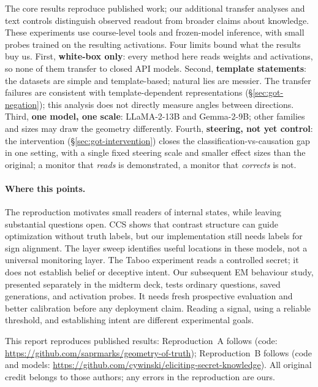 \documentclass{article}
\begin{document}
The core results reproduce published work; our additional transfer analyses
and text controls distinguish observed readout from broader claims about
knowledge. These experiments use course-level tools and frozen-model
inference, with small probes trained on the resulting activations. Four limits bound what the
results buy us. First, \textbf{white-box only}: every method here reads weights
and activations, so none of them transfer to closed API models. Second,
\textbf{template statements}: the datasets are simple and template-based;
natural lies are messier. The transfer failures are consistent with
template-dependent representations (\S\ref{sec:got-negation}); this analysis
does not directly measure angles between directions. Third, \textbf{one model,
one scale}: LLaMA-2-13B and Gemma-2-9B; other families and sizes may draw the
geometry differently. Fourth, \textbf{steering, not yet control}: the
intervention (\S\ref{sec:got-intervention}) closes the classification-vs-causation
gap in one setting, with a single fixed steering scale and smaller effect sizes
than the original; a monitor that \emph{reads} is demonstrated, a monitor that
\emph{corrects} is not.

\paragraph{Where this points.} The reproduction motivates small readers of
internal states, while leaving substantial questions open. CCS shows that
contrast structure can guide optimization without truth labels, but our
implementation still needs labels for sign alignment. The layer sweep
identifies useful locations in these models, not a universal monitoring
layer. The Taboo experiment reads a controlled secret; it does not establish
belief or deceptive intent. Our subsequent EM behaviour study, presented
separately in the midterm deck, tests ordinary questions, saved generations,
and activation probes. It needs fresh prospective evaluation and better
calibration before any deployment claim. Reading a signal, using a reliable
threshold, and establishing intent are different experimental goals.

\begin{ack}
This report reproduces published results: Reproduction~A follows
\citet{marks2024geometry} (code: \url{https://github.com/saprmarks/geometry-of-truth});
Reproduction~B follows \citet{cywinski2025eliciting} (code and models:
\url{https://github.com/cywinski/eliciting-secret-knowledge}). All original
credit belongs to those authors; any errors in the reproduction are ours.
\end{ack}



\end{document}
